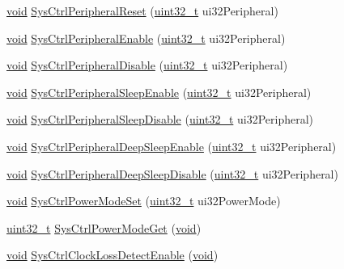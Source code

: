\begin{DoxyCompactItemize}
\item 
\hyperlink{usb__devapi_8h_afabf60e7f57651d6d595a02c75f07cd0}{void} \hyperlink{group__sysctl__api_ga8463c0e214a5afd26a6560d9927e84ff}{Sys\+Ctrl\+Peripheral\+Reset} (\hyperlink{_p_e___types_8h_a33594304e786b158f3fb30289278f5af}{uint32\+\_\+t} ui32\+Peripheral)
\item 
\hyperlink{usb__devapi_8h_afabf60e7f57651d6d595a02c75f07cd0}{void} \hyperlink{group__sysctl__api_ga707635f836e3eb681db0b8ab01ca6dd8}{Sys\+Ctrl\+Peripheral\+Enable} (\hyperlink{_p_e___types_8h_a33594304e786b158f3fb30289278f5af}{uint32\+\_\+t} ui32\+Peripheral)
\item 
\hyperlink{usb__devapi_8h_afabf60e7f57651d6d595a02c75f07cd0}{void} \hyperlink{group__sysctl__api_gae122cc9e5d7dc0e66330a7685a0886ac}{Sys\+Ctrl\+Peripheral\+Disable} (\hyperlink{_p_e___types_8h_a33594304e786b158f3fb30289278f5af}{uint32\+\_\+t} ui32\+Peripheral)
\item 
\hyperlink{usb__devapi_8h_afabf60e7f57651d6d595a02c75f07cd0}{void} \hyperlink{group__sysctl__api_gaeb5ea8d77481c835b1221f094b0ec850}{Sys\+Ctrl\+Peripheral\+Sleep\+Enable} (\hyperlink{_p_e___types_8h_a33594304e786b158f3fb30289278f5af}{uint32\+\_\+t} ui32\+Peripheral)
\item 
\hyperlink{usb__devapi_8h_afabf60e7f57651d6d595a02c75f07cd0}{void} \hyperlink{group__sysctl__api_gace9d651e5b048b9727613b5c913d59c0}{Sys\+Ctrl\+Peripheral\+Sleep\+Disable} (\hyperlink{_p_e___types_8h_a33594304e786b158f3fb30289278f5af}{uint32\+\_\+t} ui32\+Peripheral)
\item 
\hyperlink{usb__devapi_8h_afabf60e7f57651d6d595a02c75f07cd0}{void} \hyperlink{group__sysctl__api_gacfbf719733b43ee4bf0edccccb935cfc}{Sys\+Ctrl\+Peripheral\+Deep\+Sleep\+Enable} (\hyperlink{_p_e___types_8h_a33594304e786b158f3fb30289278f5af}{uint32\+\_\+t} ui32\+Peripheral)
\item 
\hyperlink{usb__devapi_8h_afabf60e7f57651d6d595a02c75f07cd0}{void} \hyperlink{group__sysctl__api_ga674db307ff90822924fc19b79444049a}{Sys\+Ctrl\+Peripheral\+Deep\+Sleep\+Disable} (\hyperlink{_p_e___types_8h_a33594304e786b158f3fb30289278f5af}{uint32\+\_\+t} ui32\+Peripheral)
\item 
\hyperlink{usb__devapi_8h_afabf60e7f57651d6d595a02c75f07cd0}{void} \hyperlink{group__sysctl__api_ga58c66b2a49a5650f87e99f74595669bb}{Sys\+Ctrl\+Power\+Mode\+Set} (\hyperlink{_p_e___types_8h_a33594304e786b158f3fb30289278f5af}{uint32\+\_\+t} ui32\+Power\+Mode)
\item 
\hyperlink{_p_e___types_8h_a33594304e786b158f3fb30289278f5af}{uint32\+\_\+t} \hyperlink{group__sysctl__api_ga5a2c3a4f383f077ea617bb609e160a3c}{Sys\+Ctrl\+Power\+Mode\+Get} (\hyperlink{usb__devapi_8h_afabf60e7f57651d6d595a02c75f07cd0}{void})
\item 
\hyperlink{usb__devapi_8h_afabf60e7f57651d6d595a02c75f07cd0}{void} \hyperlink{group__sysctl__api_gaa06fdb466c07780b7c28a30d68f6da73}{Sys\+Ctrl\+Clock\+Loss\+Detect\+Enable} (\hyperlink{usb__devapi_8h_afabf60e7f57651d6d595a02c75f07cd0}{void})
\end{DoxyCompactItemize}


